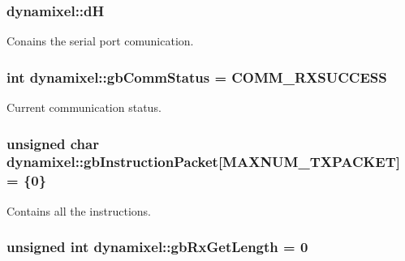 \subsubsection[{d\+H}]{ dynamixel\+::d\+H\hspace{0.3cm}{\ttfamily [private]}}\label{classdynamixel_ae003cc90ada6d7b70eaa4ea9d42d4deb}


Conains the serial port comunication. 

\hypertarget{classdynamixel_a5b603f6bed7ccc595f1f50bd6a6ebbfc}{}
\subsubsection[{gb\+Comm\+Status}]{\setlength{\rightskip}{0pt plus 5cm}int dynamixel\+::gb\+Comm\+Status = C\+O\+M\+M\+\_\+\+R\+X\+S\+U\+C\+C\+E\+S\+S\hspace{0.3cm}{\ttfamily [private]}}\label{classdynamixel_a5b603f6bed7ccc595f1f50bd6a6ebbfc}


Current communication status. 

\hypertarget{classdynamixel_afd94dcf01b8e96298727776e222de722}{}
\subsubsection[{gb\+Instruction\+Packet}]{\setlength{\rightskip}{0pt plus 5cm}unsigned char dynamixel\+::gb\+Instruction\+Packet\mbox{[}M\+A\+X\+N\+U\+M\+\_\+\+T\+X\+P\+A\+C\+K\+E\+T\mbox{]} = \{0\}\hspace{0.3cm}{\ttfamily [private]}}\label{classdynamixel_afd94dcf01b8e96298727776e222de722}


Contains all the instructions. 

\hypertarget{classdynamixel_a9d590ce24791d111c2db9b66be1e046d}{}
\subsubsection[{gb\+Rx\+Get\+Length}]{\setlength{\rightskip}{0pt plus 5cm}unsigned int dynamixel\+::gb\+Rx\+Get\+Length = 0\hspace{0.3cm}{\ttfamily [private]}}\label{classdynamixel_a9d590ce24791d111c2db9b66be1e046d}


